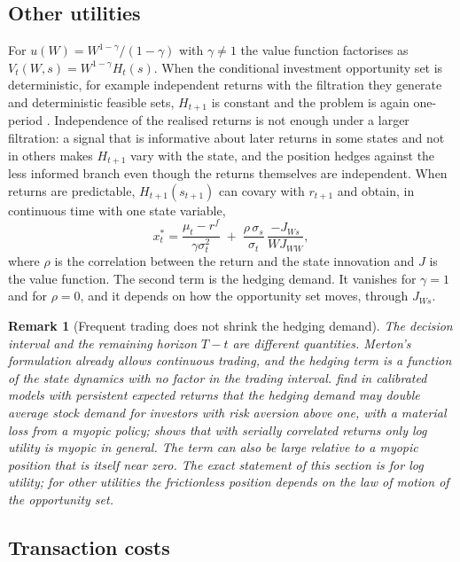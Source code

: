 \documentclass[11pt]{article}
\newtheorem{remark}{Remark}
\begin{document}
\subsection{Other utilities}

For $u(W) = W^{1-\gamma}/(1-\gamma)$ with $\gamma \ne 1$ the value function factorises as $V_t(W, s) = W^{1-\gamma} H_t(s)$. When the conditional investment opportunity set is deterministic, for example independent returns with the filtration they generate and deterministic feasible sets, $H_{t+1}$ is constant and the problem is again one-period \citep{samuelson1969}. Independence of the realised returns is not enough under a larger filtration: a signal that is informative about later returns in some states and not in others makes $H_{t+1}$ vary with the state, and the position hedges against the less informed branch even though the returns themselves are independent. When returns are predictable, $H_{t+1}(s_{t+1})$ can covary with $r_{t+1}$ and \citet{merton1971,merton1973} obtain, in continuous time with one state variable,
\[
x_t^\ast = \frac{\mu_t - r^f}{\gamma \sigma_t^2} \;+\; \frac{\rho\, \sigma_{s}}{\sigma_t}\,\frac{-J_{Ws}}{W J_{WW}},
\]
where $\rho$ is the correlation between the return and the state innovation and $J$ is the value function. The second term is the hedging demand. It vanishes for $\gamma = 1$ and for $\rho = 0$, and it depends on how the opportunity set moves, through $J_{Ws}$.

\begin{remark}[Frequent trading does not shrink the hedging demand]
The decision interval and the remaining horizon $T - t$ are different quantities. Merton's formulation already allows continuous trading, and the hedging term is a function of the state dynamics with no factor in the trading interval. \citet{campbell1999} find in calibrated models with persistent expected returns that the hedging demand may double average stock demand for investors with risk aversion above one, with a material loss from a myopic policy; \citet{hakansson1971} shows that with serially correlated returns only log utility is myopic in general. The term can also be large relative to a myopic position that is itself near zero. The exact statement of this section is for log utility; for other utilities the frictionless position depends on the law of motion of the opportunity set.
\end{remark}

\subsection{Transaction costs}
\end{document}
